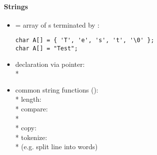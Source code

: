 \paragraph{Strings}
\begin{itemize}
  \item = array of s terminated by :
  \begin{lstlisting}[style=customc]
char A[] = { 'T', 'e', 's', 't', '\0' };
char A[] = "Test";
  \end{lstlisting}
  \item declaration via pointer: \\*
  \item common string functions (): \\*
    length:  \\*
    compare: \\* \phantom{x}  \\*
    copy:  \\*
    tokenize:  \\* \phantom{x} (e.g. split line into words)
\end{itemize}

